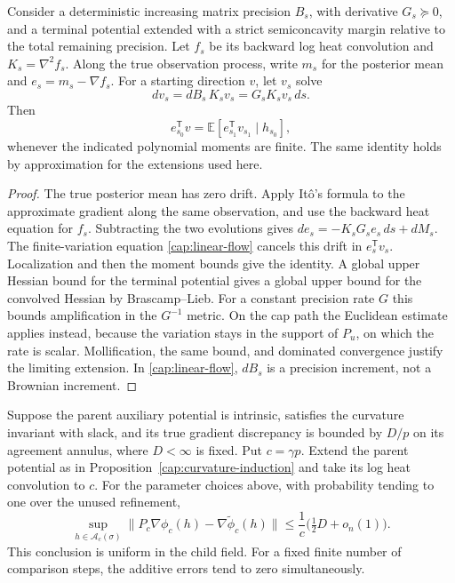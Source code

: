 \begin{lemma}\label{cap:error-transport}\label{cap:gradient-transport}
Consider a deterministic increasing matrix precision $B_s$, with
derivative $G_s\succeq0$, and a terminal potential extended with a
strict semiconcavity margin relative to the total remaining
precision.  Let $f_s$ be its backward log heat convolution and
$K_s=\nabla^2 f_s$.  Along the true observation process, write
$m_s$ for the posterior mean and $e_s=m_s-\nabla f_s$.
For a starting direction $v$, let $v_s$ solve
\begin{equation}\label{cap:linear-flow}
 dv_s=dB_s\,K_s v_s=G_sK_sv_s\,ds.
\end{equation}
Then
\[
 e_{s_0}^{\mathsf T}v
      =\mathbb E[e_{s_1}^{\mathsf T}v_{s_1}\mid h_{s_0}],
\]
whenever the indicated polynomial moments are finite.  The same
identity holds by approximation for the extensions used here.
\end{lemma}

\begin{proof}
The true posterior mean has zero drift. Apply It\^o's formula to
the approximate gradient along the same observation, and use the backward
heat equation for $f_s$. Subtracting the two evolutions gives
$de_s=-K_sG_se_s\,ds+dM_s$.
The finite-variation equation \eqref{cap:linear-flow} cancels this
drift in $e_s^{\mathsf T}v_s$.  Localization and then the moment
bounds give the identity.  A global upper Hessian bound for the
terminal potential gives a global upper bound for the convolved
Hessian by Brascamp--Lieb.  For a constant precision rate $G$
this bounds amplification in the $G^{-1}$ metric.  On the cap
path the Euclidean estimate applies instead, because the
variation stays in the support of $P_u$, on which the rate is
scalar.  Mollification,
the same bound, and dominated convergence justify the limiting
extension.  In \eqref{cap:linear-flow}, $dB_s$ is a precision
increment, not a Brownian increment.
\end{proof}

\begin{proposition}\label{cap:gradient-contraction}
Suppose the parent auxiliary potential is intrinsic, satisfies the
curvature invariant with slack, and its true gradient discrepancy
is bounded by $D/p$ on its agreement annulus, where $D<\infty$
is fixed.  Put $c=\gamma p$.  Extend the parent potential as in
Proposition~\ref{cap:curvature-induction} and take its log heat
convolution to $c$.  For the parameter choices above, with
probability tending to one over the unused refinement,
\begin{equation}\label{cap:gradient-contraction-bound}
 \sup_{h\in\mathcal A_c(\sigma)}
 \|P_c\nabla\phi_c(h)-\nabla\widetilde\phi_c(h)\|
       \le\frac1c\bigl(\tfrac12D+o_n(1)\bigr).
\end{equation}
This conclusion is uniform in the child field.  For a fixed finite
number of comparison steps, the additive errors tend to zero
simultaneously.
\end{proposition}

